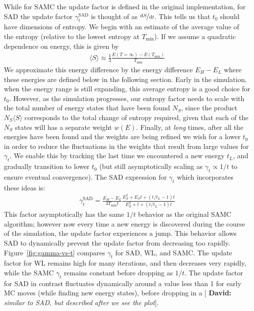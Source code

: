 \documentclass[letterpaper,twocolumn,amsmath,amssymb,pre,aps,10pt]{revtex4-1}
\newcommand{\green}[1]{{\bf \color{green} #1}}
\newcommand{\davidsays}[1]{{\color{red} [\green{David:} \emph{#1}]}}
\begin{document}
{\color{red}
While for SAMC the update factor is defined in the original
implementation, for SAD the update factor $\gamma_{t}^{\text{SAD}}$ is
thought of as $\nicefrac{\text{d}S}{\text{d}t}$. This tells us that
$t_0$ should have dimensions of entropy.
We begin with an estimate of the average value of the entropy (relative
to the lowest entropy at $T_{\min}$).  If we assume a quadratic
dependence on energy, this is given by
\begin{align}
\langle S\rangle \approx \frac13 \frac{E({T=\infty}) - E(T_{\min})}{T_{\min}}
\end{align}
We approximate this energy difference by the energy difference
$E_H -E_L$ where these energies are defined below in the following
section.  Early in the simulation, when the energy range is still
expanding, this average entropy is a good choice
for $t_0$.  However, as the simulation progresses, our entropy factor
needs to scale with the total number of energy states that have been
found $N_S$, since the product $N_S\langle S\rangle$ corresponds to the
total change of entropy required, given that each of the $N_S$ states
will has a separate weight $w(E)$.  Finally, at \emph{long} times, after
all the energies have been found and the weights are being refined
we wish for a lower $t_0$ in order to reduce the fluctuations in the
weights that result from large values for $\gamma_t$.  We enable this
by tracking the last time we encountered a new energy $t_L$, and
gradually transition to lower $t_0$ (but still asymptotically scaling
as $\gamma_t \propto 1/t$ to ensure eventual convergence).  The SAD
expression for $\gamma_t$ which incorporates these ideas is:
\begin{align}
  \gamma_{t}^{\text{SAD}} =
     \frac{E_{H}-E_{L}}{3T_{\text{min}}t}
    \frac{
      E_S^2 + E_S t + \left(t/t_L-1\right)t
    }{
      E_S^2 + t + \left(t/t_L-1\right)t
    }
\end{align}
This factor asymptotically has the same $1/t$ behavior as the original
SAMC algorithm;
however now every time a new energy is discovered during the course of
the simulation, the update factor experiences a jump. This behavior
allows SAD to dynamically prevent the update factor from decreasing too
rapidly. Figure~\ref{fig:gamma-vs-t} compares $\gamma_t$ for SAD, WL,
and SAMC.  The update factor
for WL remains high for many iterations, and then decreases very rapidly,
while the SAMC $\gamma_t$ remains constant before dropping as $1/t$.
The update factor for SAD in contrast fluctuates
dynamically around a value less than 1 for early MC moves
(while finding new energy states), before dropping in a \davidsays{similar
to SAD, but described after we see the plot}.
}
\end{document}
